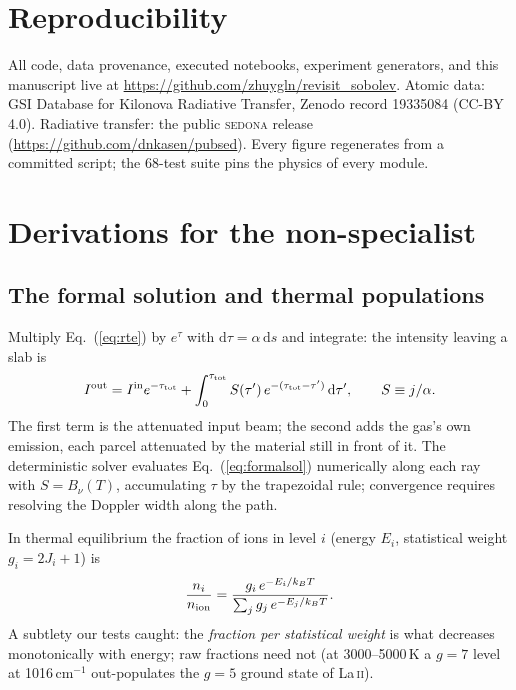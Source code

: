 \documentclass[fleqn,usenatbib]{mnras}
\begin{document}
\section*{Reproducibility}

All code, data provenance, executed notebooks, experiment generators, and
this manuscript live at
\url{https://github.com/zhuygln/revisit_sobolev}. Atomic data: GSI Database
for Kilonova Radiative Transfer, Zenodo record 19335084 (CC-BY 4.0).
Radiative transfer: the public \textsc{sedona} release
(\url{https://github.com/dnkasen/pubsed}). Every figure regenerates from a
committed script; the 68-test suite pins the physics of every module.

\appendix

\section{Derivations for the non-specialist}

\subsection{The formal solution and thermal populations}
\label{app:formal}

Multiply Eq.~(\ref{eq:rte}) by $e^{\tau}$ with
$\mathrm{d}\tau = \alpha\,\mathrm{d}s$ and integrate: the intensity leaving
a slab is
\begin{equation}
  I^{\rm out}
  = I^{\rm in} e^{-\tau_{\rm tot}}
  + \int_0^{\tau_{\rm tot}} S(\tau')\, e^{-(\tau_{\rm tot}-\tau')}\,
  \mathrm{d}\tau',
  \qquad S \equiv j/\alpha .
  \label{eq:formalsol}
\end{equation}
The first term is the attenuated input beam; the second adds the gas's own
emission, each parcel attenuated by the material still in front of it. The
deterministic solver evaluates Eq.~(\ref{eq:formalsol}) numerically along
each ray with $S = B_\nu(T)$, accumulating $\tau$ by the trapezoidal rule;
convergence requires resolving the Doppler width along the path.

In thermal equilibrium the fraction of ions in level $i$ (energy $E_i$,
statistical weight $g_i = 2J_i+1$) is
\begin{equation}
  \frac{n_i}{n_{\rm ion}}
  = \frac{g_i\, e^{-E_i/k_BT}}{\sum_j g_j\, e^{-E_j/k_BT}} .
\end{equation}
A subtlety our tests caught: the \emph{fraction per statistical weight} is
what decreases monotonically with energy; raw fractions need not (at
3000--5000\,K a $g=7$ level at 1016\,cm$^{-1}$ out-populates the $g=5$
ground state of La\,\textsc{ii}).
\end{document}
